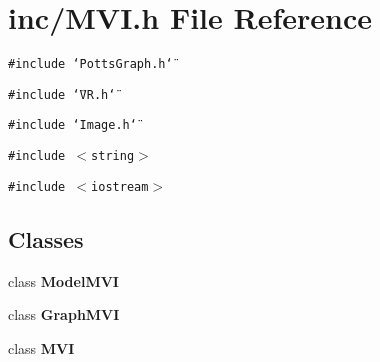 \section{inc/MVI.h File Reference}
\label{MVI_8h}
{\tt \#include \char`\"{}PottsGraph.h\char`\"{}}\par
{\tt \#include \char`\"{}VR.h\char`\"{}}\par
{\tt \#include \char`\"{}Image.h\char`\"{}}\par
{\tt \#include $<$string$>$}\par
{\tt \#include $<$iostream$>$}\par
\subsection*{Classes}
\begin{CompactItemize}
\item 
class {\bf ModelMVI}
\item 
class {\bf GraphMVI}
\item 
class {\bf MVI}
\end{CompactItemize}
